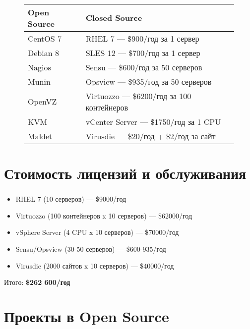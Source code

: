 \begin{frame}
\frametitle{\insertsection}
\begin{figure}[h]
	\begin{tabular}{|l|l|}
		\hline
		\bf{Open Source} & \bf{Closed Source} \\ \hline
		CentOS 7 & RHEL 7 --- \$900/год за 1 сервер \\
		Debian 8 & SLES 12 --- \$700/год за 1 сервер \\ \hline
		Nagios & Sensu --- \$600/год за 50 серверов \\
		Munin & Opsview --- \$935/год за 50 серверов \\ \hline
		OpenVZ & Virtuozzo --- \$6200/год за 100 контейнеров \\
		KVM & vCenter Server --- \$1750/год за 1 CPU \\ \hline
		Maldet & Virusdie --- \$20/год + \$2/год за сайт \\ \hline
	\end{tabular}
\end{figure}
\end{frame}


\section{Стоимость лицензий и обслуживания}

\begin{frame}
\frametitle{\insertsection}
\begin{itemize}
	\item RHEL 7 (10 серверов) --- \$9000/год
	\item Virtuozzo (100 контейнеров x 10 серверов) --- \$62000/год
	\item vSphere Server (4 CPU x 10 серверов) --- \$70000/год
	\item Sensu/Opsview (30-50 серверов) --- \$600-935/год
	\item Virusdie (2000 сайтов x 10 серверов) --- \$40000/год
\end{itemize}
Итого: \bf{\$262 600/год}
\end{frame}


\section{Проекты в Open Source}

